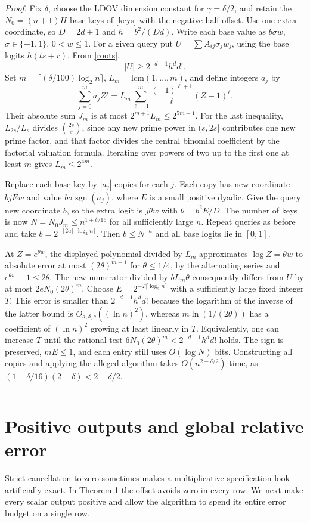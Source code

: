 \documentclass[11pt,letterpaper]{article}
\newcommand{\qedmark}{\unskip\nobreak\hfill\rule{0.5em}{0.5em}}
\begin{document}
\textit{Proof.} Fix $\delta$, choose the LDOV dimension constant for $\gamma=\delta/2$, and retain the $N_0=(n+1)H$ base keys of \eqref{keys} with the negative half offset. Use one extra coordinate, so $D=2d+1$ and $h=b^2/(Dd)$. Write each base value as $b\sigma w$, $\sigma\in\{-1,1\}$, $0<w\le1$. For a given query put $U=\sum A_{ij}\sigma_j w_j$, using the base logits $h(ts+r)$. From \eqref{roots},
\[
 |U|\ge 2^{-d-1}h^d d! .
\]
Set $m=\lceil(\delta/100)\log_2 n\rceil$, $L_m=\mathrm{lcm}(1,\ldots,m)$, and define integers $a_j$ by
\[
 \sum_{j=0}^m a_j Z^j=L_m\sum_{\ell=1}^m
       \frac{(-1)^{\ell+1}}{\ell}(Z-1)^\ell .
\]
Their absolute sum $J_m$ is at most $2^{m+1} L_m\le2^{5m+1}$. For the last inequality, $L_{2s}/L_s$ divides $\binom{2s}{s}$, since any new prime power in $(s,2s]$ contributes one new prime factor, and that factor divides the central binomial coefficient by the factorial valuation formula. Iterating over powers of two up to the first one at least $m$ gives $L_m\le 2^{4m}$.

Replace each base key by $|a_j|$ copies for each $j$. Each copy has new coordinate $b j E w$ and value $b\sigma\operatorname{sgn}(a_j)$, where $E$ is a small positive dyadic. Give the query new coordinate $b$, so the extra logit is $j\theta w$ with $\theta=b^2 E/D$. The number of keys is now $N=N_0 J_m\le n^{1+\delta/16}$ for all sufficiently large $n$. Repeat queries as before and take $b=2^{-\lceil2a\rceil\lceil\log_2 n\rceil}$. Then $b\le N^{-a}$ and all base logits lie in $[0,1]$.

At $Z=e^{\theta w}$, the displayed polynomial divided by $L_m$ approximates $\log Z=\theta w$ to absolute error at most $(2\theta)^{m+1}$ for $\theta\le1/4$, by the alternating series and $e^{\theta w}-1\le 2\theta$. The new numerator divided by $bL_m\theta$ consequently differs from $U$ by at most $2eN_0(2\theta)^m$. Choose $E=2^{-T\lceil\log_2 n\rceil}$ with a sufficiently large fixed integer $T$. This error is smaller than $2^{-d-1}h^d d!$ because the logarithm of the inverse of the latter bound is $O_{a,\delta,c}((\ln n)^2)$, whereas $m\ln(1/(2\theta))$ has a coefficient of $(\ln n)^2$ growing at least linearly in $T$. Equivalently, one can increase $T$ until the rational test $6N_0(2\theta)^m<2^{-d-1}h^d d!$ holds. The sign is preserved, $mE\le1$, and each entry still uses $O(\log N)$ bits. Constructing all copies and applying the alleged algorithm takes $O(n^{2-\delta/2})$ time, as $(1+\delta/16)(2-\delta)<2-\delta/2$. \qedmark
\newpage

\section{Positive outputs and global relative error}
Strict cancellation to zero sometimes makes a multiplicative specification look artificially exact. In Theorem 1 the offset avoids zero in every row. We next make every scalar output positive and allow the algorithm to spend its entire error budget on a single row.
\end{document}
